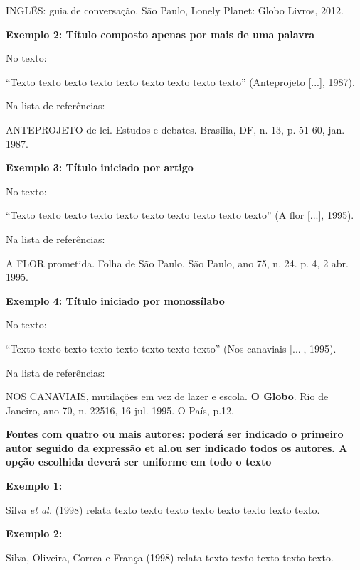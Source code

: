 \noindent INGLÊS: guia de conversação. São Paulo, Lonely Planet: Globo Livros, 2012.

\vspace{0.5cm}\noindent\textbf{Exemplo 2: Título composto apenas por mais de uma palavra}
\noindent

\noindent No texto:

“Texto texto texto texto texto texto texto texto texto” (Anteprojeto [...], 1987).

\noindent Na lista de referências:

\noindent ANTEPROJETO de lei. Estudos e debates. Brasília, DF, n. 13, p. 51-60, jan. 1987.

\vspace{0.5cm}\noindent\textbf{Exemplo 3: Título iniciado por artigo}

\noindent No texto:

“Texto texto texto texto texto texto texto texto texto texto” (A flor [...], 1995).

\noindent Na lista de referências:

\noindent A FLOR prometida. Folha de São Paulo. São Paulo, ano 75, n. 24. p. 4, 2 abr. 1995.

\vspace{0.5cm}\noindent\textbf{Exemplo 4: Título iniciado por monossílabo}

\noindent No texto:

“Texto texto texto texto texto texto texto texto” (Nos canaviais [...], 1995).

\noindent Na lista de referências:

\noindent NOS CANAVIAIS, mutilações em vez de lazer e escola. \textbf{O Globo}. Rio de Janeiro, ano 70, n. 22516, 16 jul. 1995. O País, p.12.

\vspace{0.5cm}\noindent\textbf{Fontes com quatro ou mais autores: poderá ser indicado o primeiro autor seguido da expressão et al.ou ser indicado todos os autores. A opção escolhida deverá ser uniforme em todo o texto}

\vspace{0.5cm}\noindent\textbf{Exemplo 1:}

Silva \textit{et al.} (1998) relata texto texto texto texto texto texto texto texto.

\vspace{0.5cm}\noindent\textbf{Exemplo 2:}

Silva, Oliveira, Correa e França (1998) relata texto texto texto texto texto.


